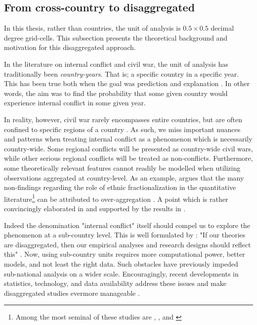 \documentclass[a4paper]{article}
\begin{document}
\subsection{From cross-country to disaggregated} %

In this thesis, rather than countries, the unit of analysis is $0.5\times0.5$ decimal degree grid-cells. This subsection presents the theoretical background and motivation for this disaggregated approach.\par

In the literature on internal conflict and civil war, the unit of analysis has traditionally been \emph{country-years}. That is; a specific country in a specific year. This has been true both when the goal was prediction \citep{Goldstone_2010, mueller_2016} and explanation \citep{Collier_Hoeffler_1998, Fearon_Laitin_2003, Collier_Hoeffler_2004, Hegre_Sambanis_2006}. In other words, the aim was to find the probability that some given country would experience internal conflict in some given year.\par

In reality, however, civil war rarely encompasses entire countries, but are often confined to specific regions of a country \cite[487]{Cederman_Gleditsch_2009}. As such, we miss important nuances and patterns when treating internal conflict as a phenomenon which is necessarily country-wide. Some regional conflicts will be presented as country-wide civil wars, while other serious regional conflicts will be treated as non-conflicts. Furthermore, some theoretically relevant features cannot readily be modelled when utilizing observations aggregated at country-level. As an example, \cite{Cederman_Gleditsch_2009} argues that the many non-findings regarding the role of ethnic fractionalization in the quantitative literature\footnote{Among the most seminal of these studies are \cite{Fearon_Laitin_2003}, \cite{Collier_Hoeffler_2004}, and \cite{Hegre_Sambanis_2006}} can be attributed to over-aggregation \citep[493]{Cederman_Gleditsch_2009}. A point which is rather convincingly elaborated in \cite{Cederman_Gleditsch_Buhaug_2013} and supported by the results in \cite{Goldstone_2010}. 

Indeed the denomination "internal conflict" itself should compel us to explore the phenomenon at a sub-country level. This is well formulated by \cite{Cederman_Gleditsch_2009}: "If our theories are disaggregated, then our empirical analyses and research designs should reflect this" \citep[490]{Cederman_Gleditsch_2009}. Now, using sub-country units requires more computational power, better models, and not least the right data. Such obstacles have previously impeded sub-national analysis on a wider scale. Encouragingly, recent developments in statistics, technology, and data availability address these issues and make disaggregated studies evermore manageable \citep[446]{ol2010afghanistan}.\par
\end{document}
